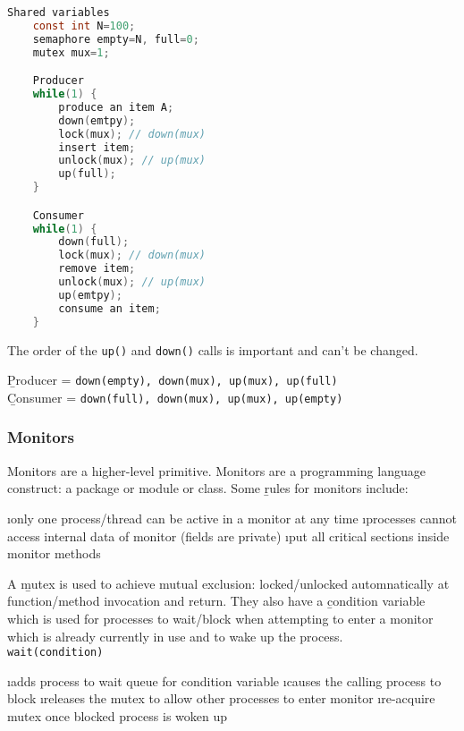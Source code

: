 \documentclass{article}
\begin{document}
    \begin{lstlisting}[language=C]
    Shared variables
    const int N=100;
    semaphore empty=N, full=0;
    mutex mux=1;

    Producer
    while(1) {
        produce an item A; 
        down(emtpy);
        lock(mux); // down(mux)
        insert item;
        unlock(mux); // up(mux)
        up(full);
    }

    Consumer 
    while(1) {
        down(full);
        lock(mux); // down(mux)
        remove item;
        unlock(mux); // up(mux)
        up(emtpy);
        consume an item;
    }
    \end{lstlisting}

    The order of the \texttt{up()} and \texttt{down()} calls is important and can't be changed. 

    \begin{center}
        \b{Producer} = \texttt{down(empty), down(mux), up(mux), up(full)} \\ 
        \b{Consumer} = \texttt{down(full), down(mux), up(mux), up(empty)}
    \end{center}

    \subsubsection{Monitors}

    Monitors are a higher-level primitive. Monitors are a programming language construct: a package or module or class. Some \b{rules for monitors} include:

    \bl 
    \i only one process/thread can be active in a monitor at any time
    \i processes cannot access internal data of monitor (fields are private)
    \i put all critical sections inside monitor methods
    \el

    \noindent A \b{mutex} is used to achieve mutual exclusion: locked/unlocked automnatically at function/method invocation and return. They also have a \b{condition variable} which is used for processes to wait/block when attempting to enter a monitor which is already currently in use and to wake up the process. \\

    \noindent \texttt{wait(condition)}

    \bl 
    \i adds process to wait queue for condition variable
    \i causes the calling process to block
    \i releases the mutex to allow other processes to enter monitor 
    \i re-acquire mutex once blocked process is woken up
    \el 
\end{document}
